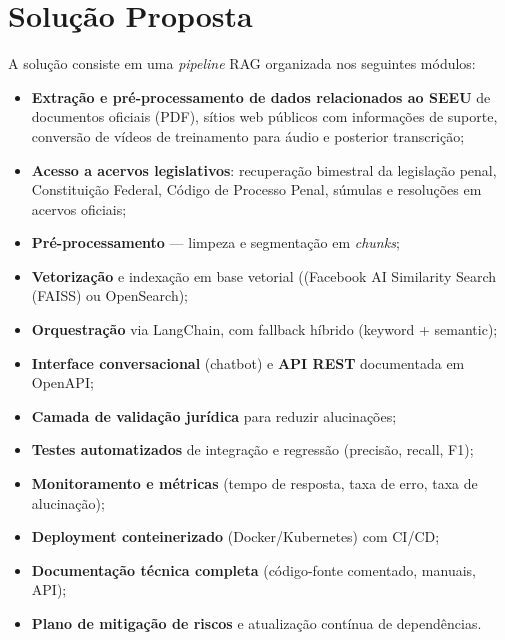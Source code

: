 
\section{Solução Proposta}
\label{sub:solucao-proposta}

A solução consiste em uma \textit{pipeline} RAG organizada nos seguintes
módulos:

\begin{itemize}[label=\textbullet]
  \item \textbf{Extração e pré-processamento de dados relacionados ao SEEU} de
        documentos oficiais (PDF), sítios web públicos com informações de
        suporte, conversão de vídeos de treinamento para áudio e posterior
        transcrição;
  \item \textbf{Acesso a acervos legislativos}: recuperação bimestral da
        legislação penal, Constituição Federal, Código de Processo Penal,
        súmulas e resoluções em acervos oficiais;
  \item \textbf{Pré-processamento} — limpeza e segmentação em \emph{chunks};
  \item \textbf{Vetorização} e indexação em base vetorial ((Facebook AI Similarity Search (FAISS) ou
        OpenSearch);
  \item \textbf{Orquestração} via LangChain, com fallback híbrido (keyword + semantic);
  \item \textbf{Interface conversacional} (chatbot) e \textbf{API REST}
        documentada em OpenAPI;
  \item \textbf{Camada de validação jurídica} para reduzir alucinações;
  \item \textbf{Testes automatizados} de integração e regressão (precisão, recall, F1);
  \item \textbf{Monitoramento e métricas} (tempo de resposta, taxa de erro, taxa de alucinação);
  \item \textbf{Deployment conteinerizado} (Docker/Kubernetes) com CI/CD;
  \item \textbf{Documentação técnica completa} (código-fonte comentado, manuais, API);
  \item \textbf{Plano de mitigação de riscos} e atualização contínua de dependências.
\end{itemize}


